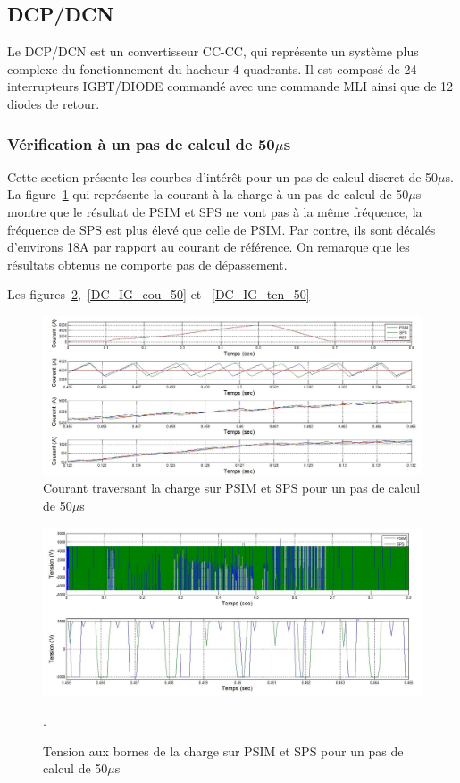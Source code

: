 \documentclass[11pt,letterpaper,final]{report}
\begin{document}
\clearpage

\subsection{DCP/DCN}
Le DCP/DCN est un convertisseur CC-CC, qui représente un système plus complexe du fonctionnement du hacheur 4 quadrants. Il est composé de 24 interrupteurs IGBT/DIODE commandé avec une commande MLI ainsi que de 12 diodes de retour.
\subsubsection{Vérification à un pas de calcul de 50$\mu$s}
Cette section présente les courbes d'intérêt pour un pas de calcul discret de 50$\mu$s. La figure~\ref{DC_ch_cou_50} qui représente la courant à la charge à un pas de calcul de 50$\mu$s montre que le résultat de PSIM et SPS ne vont pas à la même fréquence, la fréquence de SPS est plus élevé que celle de PSIM. Par contre, ils sont décalés d'environs 18A par rapport au courant de référence. On remarque que les résultats obtenus ne comporte pas de dépassement.

Les figures~\ref{DC_ch_ten_50},~\ref{DC_IG_cou_50} et ~\ref{DC_IG_ten_50}


\begin{figure}[htb]
\centering
\includegraphics[scale=0.5]{Fig/DCPDCN/DCPCourantCharge50u.jpg}
\caption{Courant traversant la charge sur PSIM et SPS pour un pas de calcul de 50$\mu$s}
\label{DC_ch_cou_50}
\end{figure}


\begin{figure}[htb]
\centering
\includegraphics[scale=0.5]{Fig/DCPDCN/DCPTensionCharge50u.jpg}
\caption{Tension aux bornes de la charge sur PSIM et SPS pour un pas de calcul de 50$\mu$s}.
\label{DC_ch_ten_50}
\end{figure}
\end{document}
